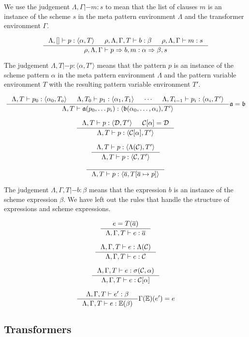 We use the judgement $\Lambda, \Gamma |- m : s$ to mean that the list of clauses $m$ is
an instance of the scheme $s$ in the meta pattern environment $\Lambda$ and the
transformer environment $\Gamma$.

\[
\inference{\Lambda, [] |- p : \langle \alpha, T \rangle &
  \rho, \Lambda, \Gamma, T |- b : \beta &
\rho, \Lambda, \Gamma |- m : s}
{\rho, \Lambda, \Gamma |- p => b, m : \alpha => \beta, s}
\]

The judgement $\Lambda, T |- p : \langle \alpha, T' \rangle$ means that the
pattern $p$ is an instance of the scheme pattern $\alpha$ in the meta pattern
environment $\Lambda$ and the pattern variable environment $T$ with the
resulting pattern variable environment $T'$.

\[
\inference{\Lambda, T |- p_0 : \langle \alpha_0, T_o \rangle &
\Lambda, T_0 |- p_1 : \langle \alpha_1, T_1 \rangle &
\cdots &
\Lambda, T_{i-1} |- p_i : \langle \alpha_i, T' \rangle
}
{\Lambda, T |- \mathfrak{a}(p_0, \ldots p_i) : \langle \mathfrak{b}(\alpha_0,
  \ldots, \alpha_i), T' \rangle}
{\mathfrak{a} = \mathfrak{b}}
\]

\[
\inference
{
  \Lambda, T |- p : \langle \mathcal{D}, T' \rangle&
  \mathcal{C}[\alpha] = \mathcal{D}
}
{
  \Lambda, T |- p : \langle \mathcal{C}[\alpha], T' \rangle
}
\]

\[
\inference
{
  \Lambda, T |- p : \langle \Lambda(\mathcal{C}), T' \rangle
}
{
  \Lambda, T |- p : \langle \mathcal{C}, T' \rangle
}
\]

\[
\inference{}
{\Lambda, T |- p : \langle \overline{a}, T[\overline{a} \mapsto p] \rangle}
\]

The judgement $\Lambda, \Gamma, T |- b : \beta$ means that the expression $b$ is
an instance of the scheme expression $\beta$. We have left out the rules that
handle the structure of expressions and scheme expressions.

\[
\inference{e = T(\overline{a})}
{\Lambda, \Gamma, T |- e : \overline{a}}
\]

\[
\inference{\Lambda, \Gamma, T |- e : \Lambda(\mathcal{C})}
{\Lambda, \Gamma, T |- e : \mathcal{C}}
\]

\[
\inference
{\Lambda, \Gamma, T |- e : \sigma(\mathcal{C}, \alpha)}
{\Lambda, \Gamma, T |- e : \mathcal{C}[\alpha]}
\]

\[
\inference{\Lambda, \Gamma, T |- e' : \beta}
{\Lambda, \Gamma, T |- e : \mathbb{E}(\beta)}{\Gamma(\mathbb{E})(e') = e}
\]

\subsection{Transformers}

